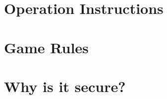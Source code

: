 \documentclass[12pt]{article}
\begin{document}
\maketitle
\section{Operation Instructions}

\maketitle
\section{Game Rules}

\maketitle
\section{Why is it secure?}
\end{document}
